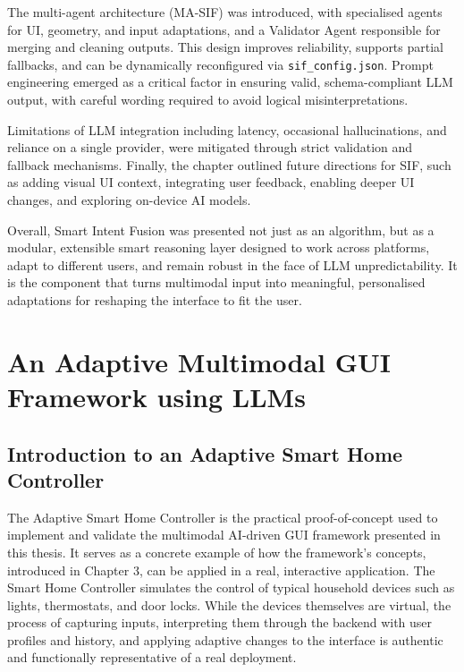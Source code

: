\documentclass[openany]{book}
\begin{document}
The multi-agent architecture (MA-SIF) was introduced, with specialised agents for UI, geometry, and input adaptations, and a Validator Agent responsible for merging and cleaning outputs. This design improves reliability, supports partial fallbacks, and can be dynamically reconfigured via \texttt{sif\_config.json}. Prompt engineering emerged as a critical factor in ensuring valid, schema-compliant LLM output, with careful wording required to avoid logical misinterpretations.

Limitations of LLM integration including latency, occasional hallucinations, and reliance on a single provider, were mitigated through strict validation and fallback mechanisms. Finally, the chapter outlined future directions for SIF, such as adding visual UI context, integrating user feedback, enabling deeper UI changes, and exploring on-device AI models.

Overall, Smart Intent Fusion was presented not just as an algorithm, but as a modular, extensible smart reasoning layer designed to work across platforms, adapt to different users, and remain robust in the face of LLM unpredictability. It is the component that turns multimodal input into meaningful, personalised adaptations for reshaping the interface to fit the user.

\chapter{An Adaptive Multimodal GUI Framework using LLMs}

\section{Introduction to an Adaptive Smart Home Controller}
The Adaptive Smart Home Controller is the practical proof-of-concept used to implement and validate the multimodal AI-driven GUI framework presented in this thesis. It serves as a concrete example of how the framework’s concepts, introduced in Chapter 3, can be applied in a real, interactive application. The Smart Home Controller simulates the control of typical household devices such as lights, thermostats, and door locks. While the devices themselves are virtual, the process of capturing inputs, interpreting them through the backend with user profiles and history, and applying adaptive changes to the interface is authentic and functionally representative of a real deployment.
\end{document}
